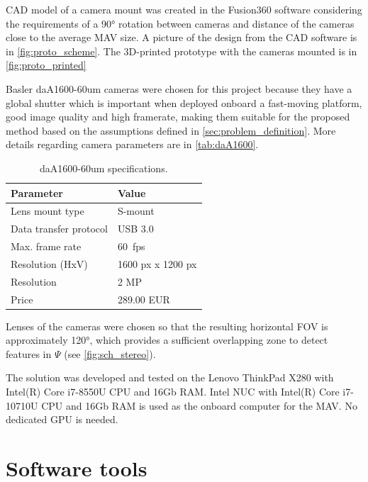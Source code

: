 CAD model of a camera mount was created in the Fusion360 software considering the requirements of a \ang{90} rotation between cameras and distance of the cameras close to the average MAV size.
A picture of the design from the CAD software is in \autoref{fig:proto_scheme}.
The 3D-printed prototype with the cameras mounted is in \autoref{fig:proto_printed}

Basler daA1600-60um cameras were chosen for this project because they have a global shutter which is important when deployed onboard a fast-moving platform, good image quality and high framerate, making them suitable for the proposed method based on the assumptions defined in \autoref{sec:problem_definition}. 
More details regarding camera parameters are in \autoref{tab:daA1600}.

\begin{table}
    \begin{center}
      \begin{tabular}{ l l }
      \hline
      Parameter              & Value             \\ \hline
      Lens mount type        & S-mount           \\
      Data transfer protocol & USB 3.0           \\
      Max. frame rate        & \SI{60}{fps}            \\
      Resolution (HxV)       & 1600 px x 1200 px \\
      Resolution             & 2 MP              \\
      Price                  & 289.00 EUR        \\ \hline
      \end{tabular}
    \end{center}
    \caption{daA1600-60um specifications.}
    \label{tab:daA1600}
\end{table}

Lenses of the cameras were chosen so that the resulting horizontal FOV is approximately \ang{120}, which provides a sufficient overlapping zone to detect features in $\Psi$ (see \autoref{fig:sch_stereo}).

The solution was developed and tested on the Lenovo ThinkPad X280 with Intel(R) Core i7-8550U CPU and 16Gb RAM.
Intel NUC with Intel(R) Core i7-10710U CPU and 16Gb RAM is used as the onboard computer for the MAV.
No dedicated GPU is needed.

\section{Software tools}
\label{sec:impl_software}

